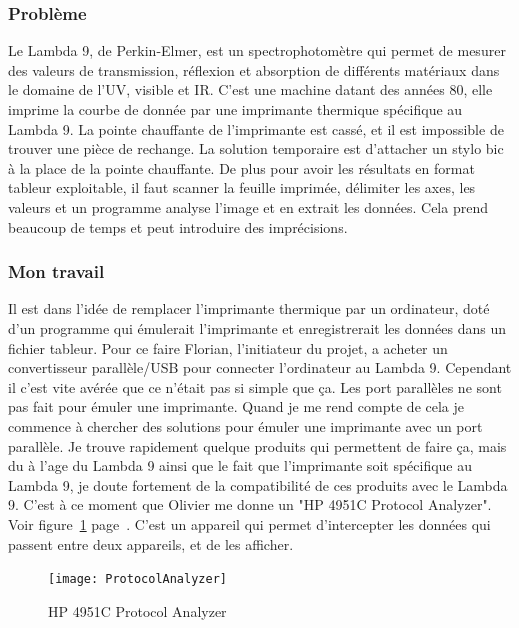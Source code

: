 \documentclass[12pt]{article}
\begin{document}
\subsubsection{ Problème }

Le Lambda 9, de Perkin-Elmer, est un spectrophotomètre qui permet de mesurer des valeurs de transmission, réflexion et absorption de différents matériaux dans le domaine de l'UV, visible et IR.
C'est une machine datant des années 80, elle imprime la courbe de donnée par une imprimante thermique spécifique au Lambda 9.
La pointe chauffante de l'imprimante est cassé, et il est impossible de trouver une pièce de rechange.
La solution temporaire est d'attacher un stylo bic à la place de la pointe chauffante.
De plus pour avoir les résultats en format tableur exploitable, il faut scanner la feuille imprimée, délimiter les axes, les valeurs et un programme analyse l'image et en extrait les données.
Cela prend beaucoup de temps et peut introduire des imprécisions.

\subsubsection{ Mon travail }

Il est dans l'idée de remplacer l'imprimante thermique par un ordinateur, doté d'un programme qui émulerait l'imprimante et enregistrerait les données dans un fichier tableur.
Pour ce faire Florian, l'initiateur du projet, a acheter un convertisseur parallèle/USB pour connecter l'ordinateur au Lambda 9.
Cependant il c'est vite avérée que ce n'était pas si simple que ça.
Les port parallèles ne sont pas fait pour émuler une imprimante.
Quand je me rend compte de cela je commence à chercher des solutions pour émuler une imprimante avec un port parallèle.
Je trouve rapidement quelque produits qui permettent de faire ça, mais du à l'age du Lambda 9 ainsi que le fait que l'imprimante soit spécifique au Lambda 9, je doute fortement de la compatibilité de ces produits avec le Lambda 9.
C'est à ce moment que Olivier me donne un "HP 4951C Protocol Analyzer".
Voir figure~\ref{fig:protocolAnalyzer} page~\pageref{fig:protocolAnalyzer}.
C'est un appareil qui permet d'intercepter les données qui passent entre deux appareils, et de les afficher.

\begin{figure}[h]
	\centering
	\texttt{[image: ProtocolAnalyzer]}
	\caption{HP 4951C Protocol Analyzer}
	\label{fig:protocolAnalyzer}
\end{figure}
\end{document}
